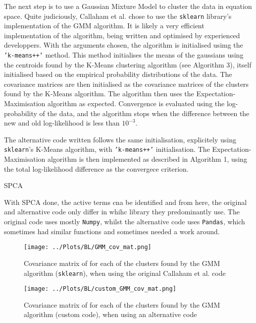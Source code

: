 \documentclass[12pt]{report} %
\begin{document}
The next step is to use a Gaussian Mixture Model to cluster the data in equation space. Quite judiciously, Callaham et al. chose to use the \texttt{sklearn} library's implementation of the GMM algorithm. It is likely a very efficient implementation of the algorithm, being written and optimised by experienced developpers. With the arguments chosen, the algorithm is initialised usimg the \texttt{'k-means++'} method. This method initialises the means of the gaussians using the centroids found by the K-Means clustering algorithm (see Algorithm 3), itself initialised based on the empirical probability distributions of the data\cite{arthur2007kmeans}. The covariance matrices are then initialised as the covariance matrices of the clusters found by the K-Means algorithm. The algorithm then uses the Expectation-Maximisation algorithm as expected. Convergence is evaluated using the log-probability of the data, and the algorithm stops when the difference between the new and old log-likelihood is less than $10^{-3}$.

The alternative code written follows the same initialisation, explicitely using \texttt{sklearn}'s K-Means algorithm, with \texttt{'k-means++'} initialisation. The Expectation-Maximisation algorithm is then implemented as described in Algorithm 1, using the total log-likelihood difference as the convergece criterion.


SPCA


With SPCA done, the active terms cna be identified and from here, the original and alternative code only differ in whihc library they predominantly use. The original code uses mostly \texttt{Numpy}, whilst the alternative code uses \texttt{Pandas}, which sometimes had similar functions and sometimes needed a work around.


\begin{figure}
  \centering
  \texttt{[image: ../Plots/BL/GMM\_cov\_mat.png]}
  \caption{Covariance matrix of for each of the clusters found by the GMM algorithm (\texttt{sklearn}), when using the original Callaham et al. code}
  \label{fig:GMM_cov_mat}
\end{figure}

\begin{figure}
  \centering
  \texttt{[image: ../Plots/BL/custom\_GMM\_cov\_mat.png]}
  \caption{Covariance matrix of for each of the clusters found by the GMM algorithm (custom code), when using an alternative code}
  \label{fig:custom_GMM_cov_mat}
\end{figure}
\end{document}
